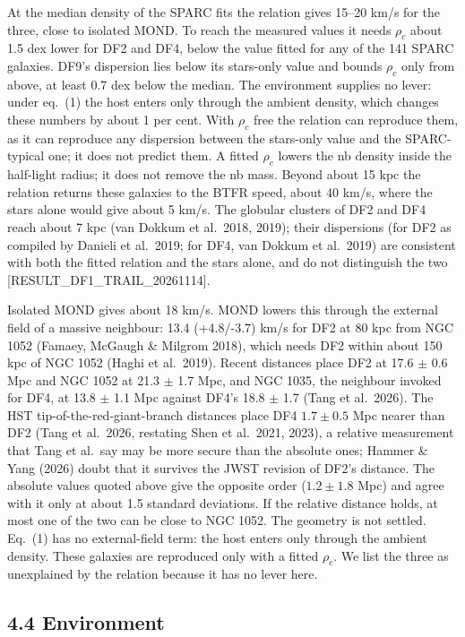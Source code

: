 \documentclass[
  10pt,
]{article}
\begin{document}
At the median density of the SPARC fits the relation gives 15--20 km/s for the three, close to isolated MOND. To reach the measured values it needs $\rho_c$ about 1.5 dex lower for DF2 and DF4, below the value fitted for any of the 141 SPARC galaxies. DF9's dispersion lies below its stars-only value and bounds $\rho_c$ only from above, at least 0.7 dex below the median. The environment supplies no lever: under eq.~(1) the host enters only through the ambient density, which changes these numbers by about 1 per cent. With $\rho_c$ free the relation can reproduce them, as it can reproduce any dispersion between the stars-only value and the SPARC-typical one; it does not predict them. A fitted $\rho_c$ lowers the nb density inside the half-light radius; it does not remove the nb mass. Beyond about 15 kpc the relation returns these galaxies to the BTFR speed, about 40 km/s, where the stars alone would give about 5 km/s. The globular clusters of DF2 and DF4 reach about 7 kpc (van Dokkum et al.~2018, 2019); their dispersions (for DF2 as compiled by Danieli et al.~2019; for DF4, van Dokkum et al.~2019) are consistent with both the fitted relation and the stars alone, and do not distinguish the two {[}RESULT\_DF1\_TRAIL\_20261114{]}.

Isolated MOND gives about 18 km/s. MOND lowers this through the external field of a massive neighbour: 13.4 (+4.8/-3.7) km/s for DF2 at 80 kpc from NGC 1052 (Famaey, McGaugh \& Milgrom 2018), which needs DF2 within about 150 kpc of NGC 1052 (Haghi et al.~2019). Recent distances place DF2 at 17.6 $\pm$ 0.6 Mpc and NGC 1052 at 21.3 $\pm$ 1.7 Mpc, and NGC 1035, the neighbour invoked for DF4, at 13.8 $\pm$ 1.1 Mpc against DF4's 18.8 $\pm$ 1.7 (Tang et al.~2026). The HST tip-of-the-red-giant-branch distances place DF4 $1.7\pm0.5$ Mpc nearer than DF2 (Tang et al.~2026, restating Shen et al.~2021, 2023), a relative measurement that Tang et al.\ say may be more secure than the absolute ones; Hammer \& Yang (2026) doubt that it survives the JWST revision of DF2's distance. The absolute values quoted above give the opposite order ($1.2\pm1.8$ Mpc) and agree with it only at about 1.5 standard deviations. If the relative distance holds, at most one of the two can be close to NGC 1052. The geometry is not settled. Eq.~(1) has no external-field term: the host enters only through the ambient density. These galaxies are reproduced only with a fitted $\rho_c$. We list the three as unexplained by the relation because it has no lever here.


\subsection{4.4 Environment}
\end{document}
